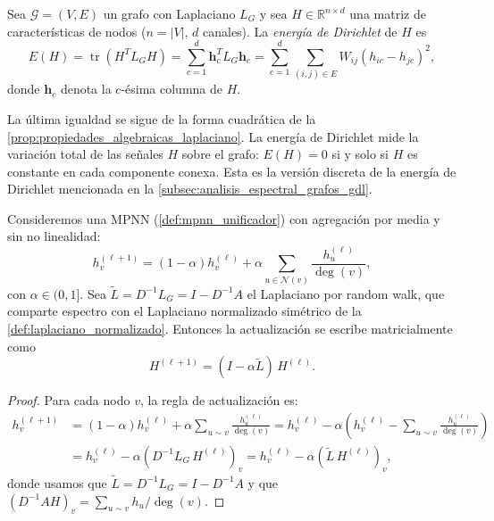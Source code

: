 \begin{definition}\label{def:energia_dirichlet_grafos}
	Sea $\mathcal{G} = (V, E)$ un grafo con Laplaciano $L_G$ y sea $H \in \mathbb{R}^{n \times d}$ una matriz de características de nodos ($n = |V|$, $d$ canales). La \textit{energía de Dirichlet} de $H$ es
	\[
		E(H) = \operatorname{tr}(H^T L_G H) = \sum_{c=1}^{d} \mathbf{h}_c^T L_G \mathbf{h}_c = \sum_{c=1}^{d} \sum_{(i,j) \in E} W_{ij}(h_{ic} - h_{jc})^2,
	\]
	donde $\mathbf{h}_c$ denota la $c$-ésima columna de $H$.
\end{definition}

La última igualdad se sigue de la forma cuadrática de la \autoref{prop:propiedades_algebraicas_laplaciano}. La energía de Dirichlet mide la variación total de las señales $H$ sobre el grafo: $E(H) = 0$ si y solo si $H$ es constante en cada componente conexa. Esta es la versión discreta de la energía de Dirichlet mencionada en la \autoref{subsec:analisis_espectral_grafos_gdl}.

\begin{proposition}\label{prop:mpnn_difusion}
	Consideremos una \gls{MPNN} (\autoref{def:mpnn_unificador}) con agregación por media y sin no linealidad:
	\[
		h_v^{(\ell+1)} = (1 - \alpha) h_v^{(\ell)} + \alpha \sum_{u \in \mathcal{N}(v)} \frac{h_u^{(\ell)}}{\deg(v)},
	\]
	con $\alpha \in (0, 1]$. Sea $\tilde{L} = D^{-1}L_G = I - D^{-1}A$ el Laplaciano por random walk, que comparte espectro con el Laplaciano normalizado simétrico de la \autoref{def:laplaciano_normalizado}. Entonces la actualización se escribe matricialmente como
	\begin{equation}\label{eq:difusion_discreta}
		H^{(\ell+1)} = (I - \alpha \tilde{L})\, H^{(\ell)}.
	\end{equation}
\end{proposition}

\begin{proof}
	Para cada nodo $v$, la regla de actualización es:
	\begin{align*}
		h_v^{(\ell+1)} &= (1-\alpha) h_v^{(\ell)} + \alpha \sum_{u \sim v} \frac{h_u^{(\ell)}}{\deg(v)} = h_v^{(\ell)} - \alpha\left(h_v^{(\ell)} - \sum_{u \sim v} \frac{h_u^{(\ell)}}{\deg(v)}\right)\\
		&= h_v^{(\ell)} - \alpha (D^{-1}L_G\, H^{(\ell)})_v = h_v^{(\ell)} - \alpha (\tilde{L}\, H^{(\ell)})_v,
	\end{align*}
	donde usamos que $\tilde{L} = D^{-1}L_G = I - D^{-1}A$ y que $(D^{-1}A H)_v = \sum_{u \sim v} h_u / \deg(v)$.
\end{proof}

